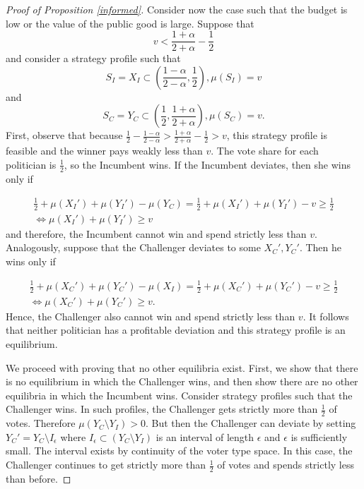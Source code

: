 \documentclass[12pt,english]{article}
\begin{document}
\begin{proof}[Proof of Proposition \ref{informed}]
Consider now the case such that the budget is low or the value of the public good is large. Suppose that
\begin{equation*}
v < \frac{1 + \alpha}{2 + \alpha} - \frac{1}{2} 
\end{equation*} 
and consider a strategy profile such that
\begin{equation*}
S_I = X_I \subset (\frac{1 - \alpha}{2 - \alpha}, \frac{1}{2}), \mu(S_I) = v
\end{equation*}
and 
\begin{equation*}
S_C = Y_C \subset (\frac{1}{2}, \frac{1 + \alpha}{2 + \alpha}), \mu(S_C) = v.
\end{equation*}
First, observe that because $\frac{1}{2}-\frac{1-\alpha }{2-\alpha }>\frac{1 + \alpha}{2 + \alpha }-\frac{1}{2} > v$, this strategy profile is feasible and the winner pays weakly less than $v$.  The vote share for each politician is $\frac{1}{2}$, so the Incumbent wins. If the Incumbent deviates, then she wins only if 

\begin{equation*}
\begin{aligned}
\frac{1}{2} + \mu(X_I') + \mu(Y_I') - \mu(Y_C)   = \frac{1}{2} + \mu(X_I') + \mu(Y_I') - v \geq \frac{1}{2}\\ \Leftrightarrow 
\mu(X_I') + \mu(Y_I') \geq v
\end{aligned}
\end{equation*}
and therefore, the Incumbent cannot win and spend strictly less than $v$. Analogously, suppose that the Challenger deviates to some $X_C', Y_C'$. Then he wins only if 

\begin{equation*}
\begin{aligned}
\frac{1}{2} + \mu(X_C') + \mu(Y_C') - \mu(X_I)   = \frac{1}{2} +  \mu(X_C') + \mu(Y_C')  - v \geq \frac{1}{2}\\ \Leftrightarrow 
\mu(X_C') + \mu(Y_C') \geq v.
\end{aligned}
\end{equation*}
Hence, the Challenger also cannot win and spend strictly less than $v$. It follows that neither politician has a profitable deviation and this strategy profile is an equilibrium.

We proceed with proving that no other equilibria exist. First, we show that there is no equilibrium in which the Challenger wins, and then show there are no other equilibria in which the Incumbent wins. Consider strategy profiles such that the Challenger wins. In such profiles, the Challenger gets strictly more than $\frac{1}{2}$ of votes. Therefore $\mu(Y_C \setminus Y_I) > 0 $. But then the Challenger can deviate by setting $Y_C' = Y_C \setminus I_\epsilon$ where $I_\epsilon \subset (Y_C \setminus Y_I) $ is an interval of length $\epsilon$ and $\epsilon$ is sufficiently small. The interval exists by continuity of the voter type space. In this case, the Challenger continues to get strictly more than $\frac{1}{2}$ of votes and spends strictly less than before. 


\end{proof}
\end{document}
